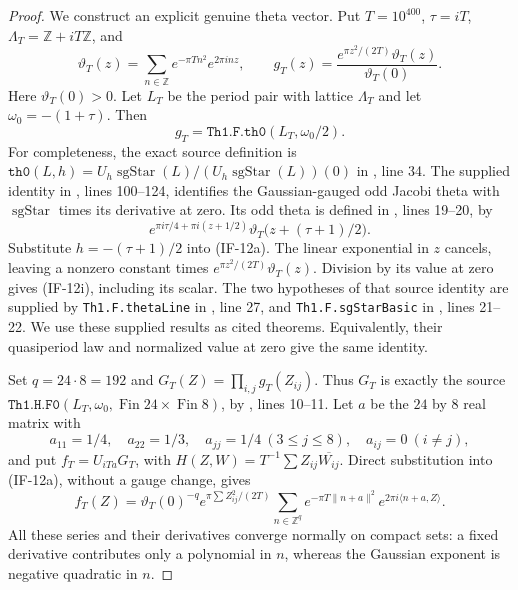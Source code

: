 \documentclass[11pt,a4paper]{article}
\theoremstyle{definition}
\theoremstyle{remark}
\begin{document}
\begin{proof}
We construct an explicit genuine theta vector. Put $T=10^{400}$,
$\tau=iT$, $\Lambda_T=\mathbb Z+iT\mathbb Z$, and
\[
 \vartheta_T(z)=\sum_{n\in\mathbb Z}
                   e^{-\pi T n^2}e^{2\pi i n z},\qquad
 g_T(z)=\frac{e^{\pi z^2/(2T)}\vartheta_T(z)}{\vartheta_T(0)}.
                                                               \tag{IF-12h}
\]
Here $\vartheta_T(0)>0$. Let $L_T$ be the period pair with lattice
$\Lambda_T$ and let $\omega_0=-(1+\tau)$. Then
\[
                g_T=\texttt{Th1.F.th0}(L_T,\omega_0/2).
                                                               \tag{IF-12i}
\]
For completeness, the exact source definition is
$\texttt{th0}(L,h)=U_h\operatorname{sgStar}(L)/
(U_h\operatorname{sgStar}(L))(0)$ in
, line 34.
The supplied identity
in 
, lines 100--124,
identifies the Gaussian-gauged odd Jacobi theta with
$\operatorname{sgStar}$ times its derivative at zero. Its odd theta
is defined in , lines 19--20, by
\[
 e^{\pi i\tau/4+\pi i(z+1/2)}
       \vartheta_T\bigl(z+(\tau+1)/2\bigr).
\]
Substitute $h=-(\tau+1)/2$ into (IF-12a). The linear exponential
in $z$ cancels, leaving a nonzero constant times
$e^{\pi z^2/(2T)}\vartheta_T(z)$. Division by its value at zero
gives (IF-12i), including its scalar. The two hypotheses of that
source identity are supplied by \texttt{Th1.F.thetaLine} in
, line 27,
and \texttt{Th1.F.sgStarBasic} in
,
lines 21--22. We use these supplied results as cited theorems.
Equivalently, their
quasiperiod law and normalized value at zero give the same identity.

Set $q=24\cdot8=192$ and
$G_T(Z)=\prod_{i,j}g_T(Z_{ij})$. Thus $G_T$ is exactly the source
$\texttt{Th1.H.F0}(L_T,\omega_0,\operatorname{Fin}24\times
\operatorname{Fin}8)$, by
, lines 10--11.
Let $a$ be the $24$ by $8$ real matrix with
\[
 a_{11}=1/4,\quad a_{22}=1/3,\quad
 a_{jj}=1/4\ (3\le j\le8),\quad a_{ij}=0\ (i\ne j),
                                                               \tag{IF-12j}
\]
and put $f_T=U_{iTa}G_T$, with
$H(Z,W)=T^{-1}\sum Z_{ij}\overline{W_{ij}}$.
Direct substitution into (IF-12a), without a gauge change, gives
\[
 f_T(Z)=\vartheta_T(0)^{-q}e^{\pi\sum Z_{ij}^2/(2T)}
      \sum_{n\in\mathbb Z^q}
       e^{-\pi T\|n+a\|^2}e^{2\pi i\langle n+a,Z\rangle}.
                                                               \tag{IF-12k}
\]
All these series and their derivatives converge normally on compact
sets: a fixed derivative contributes only a polynomial in $n$,
whereas the Gaussian exponent is negative quadratic in $n$.


\end{proof}
\end{document}
